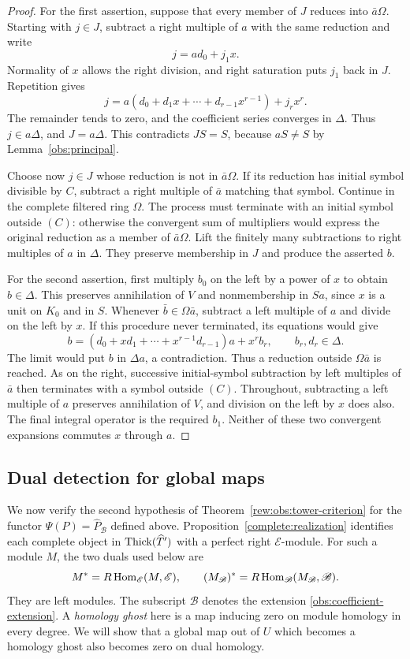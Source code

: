 \begin{proof}
For the first assertion, suppose that every member of $J$ reduces
into $\bar a\Omega$.  Starting with $j\in J$, subtract a right
multiple of $a$ with the same reduction and write
\[
 j=a d_0+j_1x.
\]
Normality of $x$ allows the right division, and right saturation
puts $j_1$ back in $J$.  Repetition gives
\[
 j=a(d_0+d_1x+\cdots+d_{r-1}x^{r-1})+j_rx^r.
\]
The remainder tends to zero, and the coefficient series converges
in $\Delta$.  Thus $j\in a\Delta$, and $J=a\Delta$.
This contradicts $JS=S$, because $aS\ne S$ by
Lemma~\ref{obs:principal}.

Choose now $j\in J$ whose reduction is not in $\bar a\Omega$.
If its reduction has initial symbol divisible by $C$, subtract a
right multiple of $\bar a$ matching that symbol.  Continue in the
complete filtered ring $\Omega$.  The process must terminate with
an initial symbol outside $(C)$: otherwise the convergent sum of
multipliers would express the original reduction as a member of
$\bar a\Omega$.  Lift the finitely many subtractions to right
multiples of $a$ in $\Delta$.  They preserve membership in $J$
and produce the asserted $b$.

For the second assertion, first multiply $b_0$ on the left by a
power of $x$ to obtain $b\in\Delta$.  This preserves annihilation
of $V$ and nonmembership in $Sa$, since $x$ is a unit on $K_0$
and in $S$.  Whenever $\bar b\in\Omega\bar a$, subtract a left
multiple of $a$ and divide on the left by $x$.  If this procedure
never terminated, its equations would give
\[
 b=(d_0+xd_1+\cdots+x^{r-1}d_{r-1})a+x^r b_r,
 \qquad b_r,d_r\in\Delta.
\]
The limit would put $b$ in $\Delta a$, a contradiction.  Thus a
reduction outside $\Omega\bar a$ is reached.  As on the right,
successive initial-symbol subtraction by left multiples of
$\bar a$ then terminates with a symbol outside $(C)$.
Throughout, subtracting a left multiple of $a$ preserves
annihilation of $V$, and division on the left by $x$ does also.
The final integral operator is the required $b_1$.
Neither of these two convergent expansions commutes $x$ through $a$.
\end{proof}

\subsection{Dual detection for global maps}

We now verify the second hypothesis of
Theorem~\ref{rew:obs:tower-criterion} for the functor
$\Psi(P)=\widehat P_{\mathscr B}$ defined above.
Proposition~\ref{complete:realization} identifies each complete
object in $\operatorname{Thick}(\widehat T')$ with a perfect right
$\mathscr E$-module.  For such a module $M$, the two duals used
below are
\[
 M^*=R\operatorname{Hom}_{\mathscr E}(M,\mathscr E),
 \qquad
 (M_{\mathscr B})^*
   =R\operatorname{Hom}_{\mathscr B}(M_{\mathscr B},\mathscr B).
\]
They are left modules.  The subscript $\mathscr B$ denotes the
extension \eqref{obs:coefficient-extension}.
A \emph{homology ghost} here is a map inducing zero on module
homology in every degree.  We will show that a global map out of
$U$ which becomes a homology ghost also becomes zero on dual
homology.

